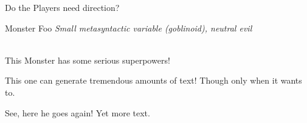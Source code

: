 \documentclass[10pt,twoside,twocolumn,openany]{book}
\begin{document}
\begin{paperbox}{Do the Players need direction?}
	\lipsum[1]
\end{paperbox}

\begin{monsterbox}{Monster Foo}
	\textit{Small metasyntactic variable (goblinoid), neutral evil}\\
	\hline
	\basics[%
	armorclass = 12,
	hitpoints  = 16 (3d8 + 3),
	speed      = 50 ft
	]
	\hline
	\stats[
    STR = \stat{12}, %
    DEX = \stat{7}
	]
	\hline
	\details[%
	languages = {Common Lisp, Erlang},
	]
	\hline \\[1mm]
	\begin{monsteraction}
		This Monster has some serious superpowers!
	\end{monsteraction}
	\begin{monsteraction}
		This one can generate tremendous amounts of text! Though only when it wants to.
	\end{monsteraction}

	\begin{monsteraction}
    See, here he goes again! Yet more text.
	\end{monsteraction}
\end{monsterbox}

\end{document}
